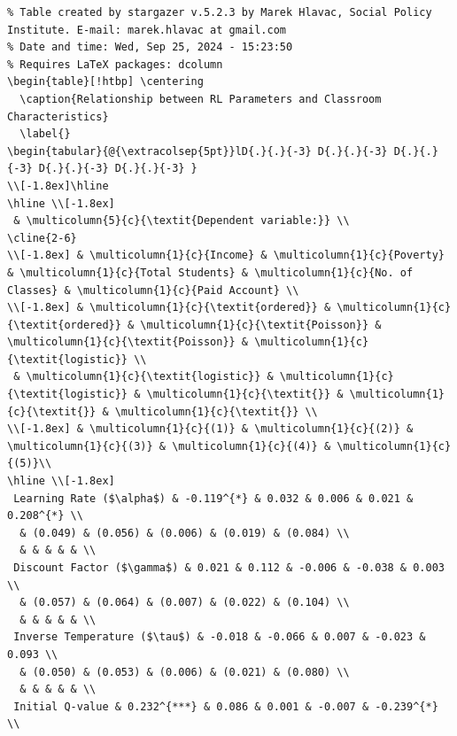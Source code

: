 \documentclass[
  number,
  preprint,
  3p,
  onecolumn]{elsarticle}
\begin{document}
\begin{table}
{\begin{verbatim}
% Table created by stargazer v.5.2.3 by Marek Hlavac, Social Policy Institute. E-mail: marek.hlavac at gmail.com
% Date and time: Wed, Sep 25, 2024 - 15:23:50
% Requires LaTeX packages: dcolumn 
\begin{table}[!htbp] \centering 
  \caption{Relationship between RL Parameters and Classroom Characteristics} 
  \label{} 
\begin{tabular}{@{\extracolsep{5pt}}lD{.}{.}{-3} D{.}{.}{-3} D{.}{.}{-3} D{.}{.}{-3} D{.}{.}{-3} } 
\\[-1.8ex]\hline 
\hline \\[-1.8ex] 
 & \multicolumn{5}{c}{\textit{Dependent variable:}} \\ 
\cline{2-6} 
\\[-1.8ex] & \multicolumn{1}{c}{Income} & \multicolumn{1}{c}{Poverty} & \multicolumn{1}{c}{Total Students} & \multicolumn{1}{c}{No. of Classes} & \multicolumn{1}{c}{Paid Account} \\ 
\\[-1.8ex] & \multicolumn{1}{c}{\textit{ordered}} & \multicolumn{1}{c}{\textit{ordered}} & \multicolumn{1}{c}{\textit{Poisson}} & \multicolumn{1}{c}{\textit{Poisson}} & \multicolumn{1}{c}{\textit{logistic}} \\ 
 & \multicolumn{1}{c}{\textit{logistic}} & \multicolumn{1}{c}{\textit{logistic}} & \multicolumn{1}{c}{\textit{}} & \multicolumn{1}{c}{\textit{}} & \multicolumn{1}{c}{\textit{}} \\ 
\\[-1.8ex] & \multicolumn{1}{c}{(1)} & \multicolumn{1}{c}{(2)} & \multicolumn{1}{c}{(3)} & \multicolumn{1}{c}{(4)} & \multicolumn{1}{c}{(5)}\\ 
\hline \\[-1.8ex] 
 Learning Rate ($\alpha$) & -0.119^{*} & 0.032 & 0.006 & 0.021 & 0.208^{*} \\ 
  & (0.049) & (0.056) & (0.006) & (0.019) & (0.084) \\ 
  & & & & & \\ 
 Discount Factor ($\gamma$) & 0.021 & 0.112 & -0.006 & -0.038 & 0.003 \\ 
  & (0.057) & (0.064) & (0.007) & (0.022) & (0.104) \\ 
  & & & & & \\ 
 Inverse Temperature ($\tau$) & -0.018 & -0.066 & 0.007 & -0.023 & 0.093 \\ 
  & (0.050) & (0.053) & (0.006) & (0.021) & (0.080) \\ 
  & & & & & \\ 
 Initial Q-value & 0.232^{***} & 0.086 & 0.001 & -0.007 & -0.239^{*} \\ 

\end{verbatim}}
\end{table}
\end{document}

